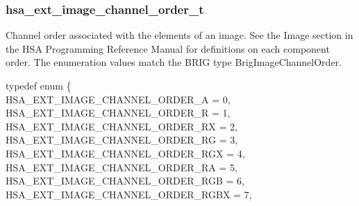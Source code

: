\documentclass[final,oneside]{book}
\newcommand{\reftyp}[1]{#1}
\newcommand{\refenu}[1]{\reftyp{#1}}
\newenvironment{mylongtable}{\rowcolors{0}{lightgray}{lightgray}\longtable} {
\endlongtable}
\begin{document}
\subsubsection{hsa_\-ext_\-image_\-channel_\-order_\-t}
\vspace{-2.5mm}Channel order associated with the elements of an image. See the Image section in the HSA Programming Reference Manual for definitions on each component order. The enumeration values match the BRIG type BrigImageChannelOrder.\begin{mylongtable}{@{}p{\textwidth}}
\rule{0pt}{3ex}typedef enum \{\\\hspace{1.7em}\hypertarget{group__ext-images_1ggabaced4fb1f3b9fdaa978e143af5ff055aa68ce325d9662ff1a1c78598835c8d55}{\refenu{HSA_\-EXT_\-IMAGE_\-CHANNEL_\-ORDER_\-A}} = 0,\\
\hspace{1.7em}\hypertarget{group__ext-images_1ggabaced4fb1f3b9fdaa978e143af5ff055ae6f5e256120da86e073db6a996e778d7}{\refenu{HSA_\-EXT_\-IMAGE_\-CHANNEL_\-ORDER_\-R}} = 1,\\
\hspace{1.7em}\hypertarget{group__ext-images_1ggabaced4fb1f3b9fdaa978e143af5ff055ad22499f0285b97596caa1a316f839ace}{\refenu{HSA_\-EXT_\-IMAGE_\-CHANNEL_\-ORDER_\-RX}} = 2,\\
\hspace{1.7em}\hypertarget{group__ext-images_1ggabaced4fb1f3b9fdaa978e143af5ff055a49185aef99188ff46b53d4da23614798}{\refenu{HSA_\-EXT_\-IMAGE_\-CHANNEL_\-ORDER_\-RG}} = 3,\\
\hspace{1.7em}\hypertarget{group__ext-images_1ggabaced4fb1f3b9fdaa978e143af5ff055a59e32fe3e15c24a407c5f1e56a6935f4}{\refenu{HSA_\-EXT_\-IMAGE_\-CHANNEL_\-ORDER_\-RGX}} = 4,\\
\hspace{1.7em}\hypertarget{group__ext-images_1ggabaced4fb1f3b9fdaa978e143af5ff055a7ec545d6291f17a9a779b6f673fad718}{\refenu{HSA_\-EXT_\-IMAGE_\-CHANNEL_\-ORDER_\-RA}} = 5,\\
\hspace{1.7em}\hypertarget{group__ext-images_1ggabaced4fb1f3b9fdaa978e143af5ff055ae3d2eed3398c973eab1e66e1b92a8efe}{\refenu{HSA_\-EXT_\-IMAGE_\-CHANNEL_\-ORDER_\-RGB}} = 6,\\
\hspace{1.7em}\hypertarget{group__ext-images_1ggabaced4fb1f3b9fdaa978e143af5ff055a3d93bdf6b20f6409a9d684646908bfe1}{\refenu{HSA_\-EXT_\-IMAGE_\-CHANNEL_\-ORDER_\-RGBX}} = 7,\\

\end{mylongtable}
\end{document}
